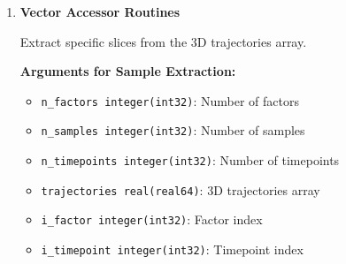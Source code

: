 \begin{enumerate}
\begin{enumerate}
\begin{itemize}
                    \item \texttt{integrated\_contribs real(real64)}: Output integrated contributions
                          [n\_samples]
                          
                    \item \texttt{spike\_contribs real(real64)}: Output spike contributions
                          [n\_timepoints, n\_samples]
                          
                    \item \texttt{ierr integer(int32)}: Error code
                  \end{itemize}
                  \begin{lstlisting}[language=Fortran, caption={Allocation-Based Contributions Calculation}]
call calc_contributions_alloc(trajectories, n_factors, n_samples, &
                    n_timepoints, i_factor, dependent_idx, mode, &
                    spike_contribs, integrated_contribs, ierr)
                  \end{lstlisting}
                  
            \item \textbf{Vector Accessor Routines}
                  
                  Extract specific slices from the 3D trajectories array.
                  
                  \textbf{Arguments for Sample Extraction:}
                  \begin{itemize}
                    \item \texttt{n\_factors integer(int32)}: Number of factors
                          
                    \item \texttt{n\_samples integer(int32)}: Number of samples
                          
                    \item \texttt{n\_timepoints integer(int32)}: Number of timepoints
                          
                    \item \texttt{trajectories real(real64)}: 3D trajectories array
                          
                    \item \texttt{i\_factor integer(int32)}: Factor index
                          
                    \item \texttt{i\_timepoint integer(int32)}: Timepoint index
                          

\end{itemize}
\end{enumerate}
\end{enumerate}
